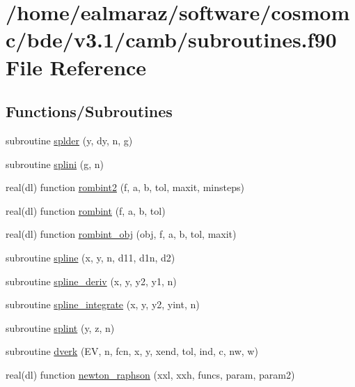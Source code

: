 \hypertarget{subroutines_8f90}{}\section{/home/ealmaraz/software/cosmomc/bde/v3.1/camb/subroutines.f90 File Reference}
\label{subroutines_8f90}
\subsection*{Functions/\+Subroutines}
\begin{DoxyCompactItemize}
\item 
subroutine \mbox{\hyperlink{subroutines_8f90_ac08193bbb8f878a435cf0e52c491ad9c}{splder}} (y, dy, n, g)
\item 
subroutine \mbox{\hyperlink{subroutines_8f90_a67a919c1c3599a4f59a5a4865a4488e4}{splini}} (g, n)
\item 
real(dl) function \mbox{\hyperlink{subroutines_8f90_a9b3be772ea91c10f9c682519e5e8bf1d}{rombint2}} (f, a, b, tol, maxit, minsteps)
\item 
real(dl) function \mbox{\hyperlink{subroutines_8f90_ae1c8377d1cc1f765f031ecc37070dc7a}{rombint}} (f, a, b, tol)
\item 
real(dl) function \mbox{\hyperlink{subroutines_8f90_a5f7d81c89595cb6ea60a221b1d9da0f5}{rombint\+\_\+obj}} (obj, f, a, b, tol, maxit)
\item 
subroutine \mbox{\hyperlink{subroutines_8f90_af4fbf8a987590628c9a9d08152ce9e08}{spline}} (x, y, n, d11, d1n, d2)
\item 
subroutine \mbox{\hyperlink{subroutines_8f90_a481cbd4b768cbe245fdfe71380927e5a}{spline\+\_\+deriv}} (x, y, y2, y1, n)
\item 
subroutine \mbox{\hyperlink{subroutines_8f90_a810dcbf1c971281d698fb5f043322c5f}{spline\+\_\+integrate}} (x, y, y2, yint, n)
\item 
subroutine \mbox{\hyperlink{subroutines_8f90_a5cc3dda624e58340fa2d833b839c3b95}{splint}} (y, z, n)
\item 
subroutine \mbox{\hyperlink{subroutines_8f90_a35d319f194cbb52b3ee563ece3266ad5}{dverk}} (EV, n, fcn, x, y, xend, tol, ind, c, nw, w)
\item 
real(dl) function \mbox{\hyperlink{subroutines_8f90_adc95564e859204ebffa9612a6fcf337a}{newton\+\_\+raphson}} (xxl, xxh, funcs, param, param2)
\end{DoxyCompactItemize}



